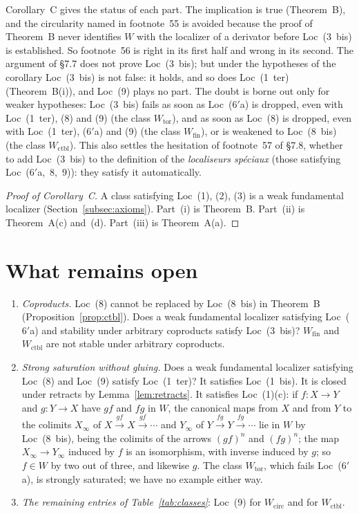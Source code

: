 \documentclass[11pt,a4paper]{article}
\theoremstyle{definition}
\newcommand{\Wcirc}{W_{\mathrm{circ}}}
\newcommand{\Wtor}{W_{\mathrm{tor}}}
\newcommand{\Wfin}{W_{\mathrm{fin}}}
\newcommand{\Wctbl}{W_{\mathrm{ctbl}}}
\begin{document}
Corollary~C gives the status of each part. The implication is true (Theorem~B), and the
circularity named in footnote~55 is avoided because the proof of Theorem~B never identifies $W$
with the localizer of a derivator before Loc~(3~bis) is established. So footnote~56 is right in
its first half and wrong in its second. The argument of \S7.7 does not prove Loc~(3~bis); but
under the hypotheses of the corollary Loc~(3~bis) is not false: it holds, and so does
Loc~(1~ter) (Theorem~B(i)), and Loc~(9) plays no part. The doubt is borne out only for weaker
hypotheses: Loc~(3~bis) fails as soon as Loc~($6'$a) is dropped, even with Loc~(1~ter), (8) and
(9) (the class $\Wtor$), and as soon as Loc~(8) is dropped, even with Loc~(1~ter), ($6'$a) and
(9) (the class $\Wfin$), or is weakened to Loc~(8~bis) (the class $\Wctbl$). This also settles the hesitation of footnote~57 of \S7.8, whether to add Loc~(3~bis) to
the definition of the \emph{localiseurs sp\'eciaux} (those satisfying Loc~($6'$a,~8,~9)): they
satisfy it automatically.

\begin{proof}[Proof of Corollary~C]
A class satisfying Loc~(1), (2), (3) is a weak fundamental localizer
(Section~\ref{subsec:axioms}). Part~(i) is Theorem~B. Part~(ii) is Theorem~A(c) and~(d). Part~(iii)
is Theorem~A(a).
\end{proof}

\section{What remains open}\label{sec:open}

\begin{enumerate}
\item \emph{Coproducts.} Loc~(8) cannot be replaced by Loc~(8~bis) in Theorem~B
(Proposition~\ref{prop:ctbl}). Does a weak fundamental localizer satisfying Loc~($6'$a) and
stability under arbitrary coproducts satisfy Loc~(3~bis)? $\Wfin$ and $\Wctbl$ are not stable
under arbitrary coproducts.
\item \emph{Strong saturation without gluing.} Does a weak fundamental localizer satisfying
Loc~(8) and Loc~(9) satisfy Loc~(1~ter)? It satisfies Loc~(1~bis). It is closed under retracts
by Lemma~\ref{lem:retracts}. It satisfies Loc~(1)(c): if $f\colon X\to Y$ and $g\colon Y\to X$
have $gf$ and $fg$ in $W$, the canonical maps from $X$ and from $Y$ to the colimits $X_\infty$
of $X\xrightarrow{gf}X\xrightarrow{gf}\cdots$ and $Y_\infty$ of
$Y\xrightarrow{fg}Y\xrightarrow{fg}\cdots$ lie in $W$ by Loc~(8~bis), being the colimits of the
arrows $(gf)^n$ and $(fg)^n$; the map $X_\infty\to Y_\infty$ induced by $f$ is an isomorphism,
with inverse induced by $g$; so $f\in W$ by two out of three, and likewise $g$. The class
$\Wtor$, which fails Loc~($6'$a), is strongly saturated; we have no example either way.
\item \emph{The remaining entries of Table~\ref{tab:classes}}: Loc~(9) for $\Wcirc$ and for
$\Wctbl$.
\end{enumerate}
\end{document}

